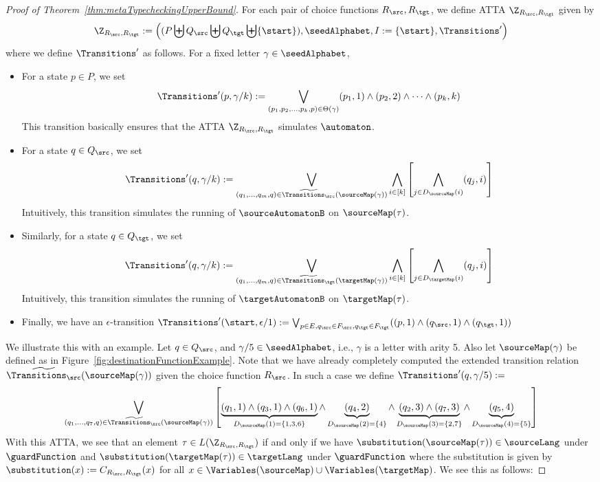 \begin{proof}[Proof of Theorem~\ref{thm:metaTypecheckingUpperBound}]
    For each pair of choice functions $R_\src, R_\tgt$, we define ATTA $\Z_{R_\src, R_\tgt}$ given by
    \[ \Z_{R_\src, R_\tgt} := \left((P \biguplus Q_\src \biguplus Q_\tgt \biguplus \{\start\}), \seedAlphabet, I := \{\start\}, \Transitions'\right) \]
    where we define $\Transitions'$ as follows. For a fixed letter $\gamma \in \seedAlphabet$,
    \begin{itemize}
        \item For a state $p \in P$, we set
        \[ \Transitions'(p, \gamma/k) := \bigvee_{(p_1, p_2, \dots, p_k, p) \in \Theta(\gamma)}(p_1, 1) \land (p_2, 2) \land \dots \land (p_k, k) \]
        This transition basically ensures that the ATTA $\Z_{R_\src, R_\tgt}$ simulates $\automaton$.
        \item For a state $q \in Q_\src$, we set
        \[ \Transitions'(q, \gamma/k) := \bigvee_{(q_1, \dots, q_m, q) \in \widetilde{\Transitions_\src}(\sourceMap(\gamma))} \bigwedge_{i \in [k]} \left[\bigwedge_{j \in D_{\sourceMap}(i)}(q_j, i)\right] \]
        Intuitively, this transition simulates the running of $\sourceAutomatonB$ on $\sourceMap(\tau)$.
        \item Similarly, for a state $q \in Q_\tgt$, we set
        \[ \Transitions'(q, \gamma/k) := \bigvee_{(q_1, \dots, q_m, q) \in \widetilde{\Transitions_\tgt}(\targetMap(\gamma))} \bigwedge_{i \in [k]} \left[\bigwedge_{j \in D_{\targetMap}(i)}(q_j, i)\right] \]
        Intuitively, this transition simulates the running of $\targetAutomatonB$ on $\targetMap(\tau)$.
        \item Finally, we have an $\epsilon$-transition $\Transitions'(\start, \epsilon/1) := \bigvee_{p \in E, q_\src \in F_\src, q_\tgt \in F_\tgt}((p, 1) \land (q_\src, 1) \land (q_\tgt, 1))$
    \end{itemize}

    We illustrate this with an example. Let $q \in Q_\src$, and $\gamma/5 \in \seedAlphabet$, i.e., $\gamma$ is a letter with arity 5. Also let $\sourceMap(\gamma)$ be defined as in Figure~\ref{fig:destinationFunctionExample}. Note that we have already completely computed the extended transition relation $\widetilde{\Transitions_\src}(\sourceMap(\gamma))$ given the choice function $R_\src$. In such a case we define $\Transitions'(q, \gamma/5) :=$
    \[
    \bigvee_{(q_1, \dots, q_7, q) \in \widetilde{\Transitions_\src}(\sourceMap(\gamma))} \left[ \underbrace{(q_1, 1) \land (q_3, 1) \land (q_6, 1)}_{D_{\sourceMap}(1) = \{1, 3, 6\}} \land \underbrace{(q_4, 2)}_{D_{\sourceMap}(2) = \{4\}} \land \underbrace{(q_2, 3) \land (q_7, 3)}_{D_{\sourceMap}(3) = \{2, 7\}} \land \underbrace{(q_5, 4)}_{D_{\sourceMap}(4) = \{5\}} \right]
    \]
    With this ATTA, we see that an element $\tau \in L(\Z_{R_\src, R_\tgt})$ if and only if we have $\substitution(\sourceMap(\tau)) \in \sourceLang$ under $\guardFunction$ and $\substitution(\targetMap(\tau)) \in \targetLang$ under $\guardFunction$ where the substitution is given by $\substitution(x) := C_{R_\src, R_\tgt}(x)$ for all $x \in \Variables(\sourceMap) \cup \Variables(\targetMap)$. We see this as follows:


\end{proof}
